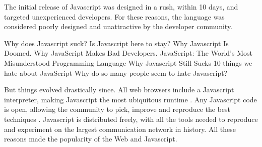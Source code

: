 The initial release of Javascript was designed in a rush, within 10 days, and targeted unexperienced developers.
For these reasons, the language was considered poorly designed and unattractive by the developer community.


{
\fontsize{10pt}{10pt}\selectfont
Why does Javascript suck?
Is Javascript here to stay?
Why Javascript Is Doomed.
Why JavaScript Makes Bad Developers.
JavaScript: The World's Most Misunderstood Programming Language
Why Javascript Still Sucks
10 things we hate about JavaScript
Why do so many people seem to hate Javascript?
}

But things evolved drastically since.
All web browsers include a Javascript interpreter, making Javascript the most ubiquitous runtime \cite{Flanagan2006}.
Any Javascript code is open, allowing the community to pick, improve and reproduce the best techniques .
Javascript is distributed freely, with all the tools needed to reproduce and experiment on the largest communication network in history.
All these reasons made the popularity of the Web and Javascript.


\paragraph{}


